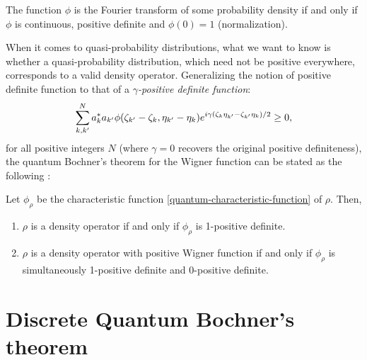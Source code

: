 \begin{theorem}\label{Bochner's theorem}
	The function $\phi$ is the Fourier transform of some probability density if and only if $\phi$ is continuous, positive definite and $\phi(0)=1$ (normalization).
\end{theorem}
When it comes to quasi-probability distributions, what we want to know is whether a quasi-probability distribution, which need not be positive everywhere, corresponds to a valid density operator. Generalizing the notion of positive definite function to that of a \emph{$\gamma$-positive definite function}:
\begin{equation}\label{gamma-positive-function}
\sum_{k,k'}^N \conj a_{k}a_{k'} \phi(\zeta_{k'}-\zeta_k,\eta_{k'}-\eta_k)e^{i\gamma (\zeta_k\eta_{k'}-\zeta_{k'}\eta_k)/2}\ge 0,
\end{equation}
for all positive integers $N$ (where $\gamma=0$ recovers the original positive definiteness), the quantum Bochner's theorem for the Wigner function can be stated as the following \cite{srinivas_nonclassical_1975,brocker_mixed_1995}:
\begin{theorem}\label{wigner_bochner}
	Let $\phi_\rho$ be the characteristic function \eqref{quantum-characteristic-function} of $\rho$.  Then,
	\begin{enumerate}
		\item $\rho$ is a density operator if and only if $\phi_\rho$ is 1-positive definite.
		\item $\rho$ is a density operator with positive Wigner function if and only if $\phi_\rho$ is simultaneously 1-positive definite and 0-positive definite.
	\end{enumerate}
\end{theorem}

\section{Discrete Quantum Bochner's theorem}\label{ch4:discrete-bochner}

